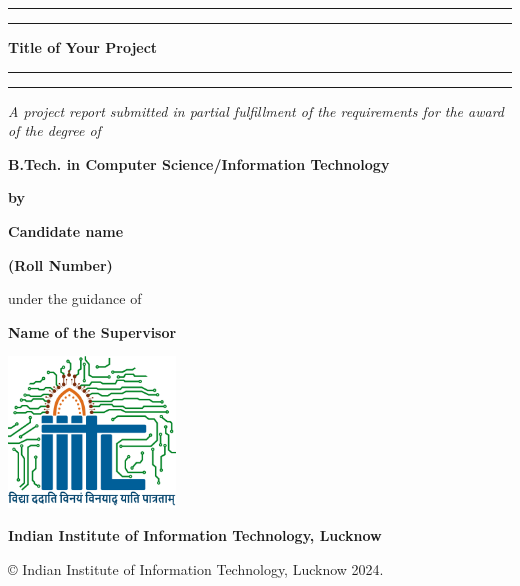 \thispagestyle{empty}

\setcounter{page}{1}

\def\thepage{\roman{page}}

\begin{center}

    \rule[0.5ex]{\linewidth}{2pt}\vspace*{-\baselineskip}\vspace*{3.2pt}
    \rule[0.5ex]{\linewidth}{2pt}
    
    \vspace*{3.2pt}

    {\Large\bf Title of Your Project}

    \vspace*{3.2pt}
    
    \rule[0.5ex]{\linewidth}{2pt}\vspace*{-\baselineskip}\vspace*{3.2pt}
    \rule[0.5ex]{\linewidth}{2pt}
    
    \vspace{1.5cm}
    
    \textit{{A project report submitted in partial fulfillment of the requirements 
    for the award of the degree of}}
    
    \vspace{1cm}
    
    {\bf B.Tech. in Computer Science/Information Technology}
    
    \vspace{1cm}
    
    {\bf by}
    
    \vspace{0.8cm}
    
    {\bf {Candidate name}}
    
    \vspace{0.1cm}
    
    {\bf {(Roll Number)}}
    
    \vspace{1.8cm}
    
    {under the guidance of}
    
    \vspace{0.1cm}

        {\bf{Name of the Supervisor}}

    
    \vspace{1.8cm}
    
    \includegraphics[height=4cm]{./Images/Logo_IIITL.png}
    
    \vspace{.5cm}
    {\bf\large{Indian Institute of Information Technology, Lucknow}}\\
    {\bf{}}
\end{center}

\medskip

\centerline{ \copyright{} Indian Institute of Information Technology, Lucknow 2024.}

\cleardoublepage






